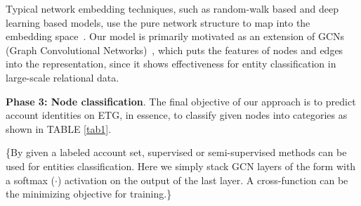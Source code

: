 Typical network embedding techniques, such as random-walk based and deep learning based models, use the pure network structure to map into the embedding space~\cite{goyal2018capturing}. Our model is primarily motivated as an extension of GCNs (Graph Convolutional Networks)~\cite{kipf2016semi,schlichtkrull2018modeling}, which puts the features of nodes and edges into the representation, since it shows effectiveness for entity classification in large-scale relational data.







\textbf{Phase 3: Node classification}.
The final objective of our approach is to predict account identities on ETG, in essence, to classify given nodes into categories as shown in TABLE \ref{tab1}.

\{By given a labeled account set, supervised or semi-supervised methods can be used for entities classification. Here we simply stack GCN layers of the form with a softmax ($\cdot$) activation on the output of the last layer. A cross-function can be the minimizing objective for training.\}

